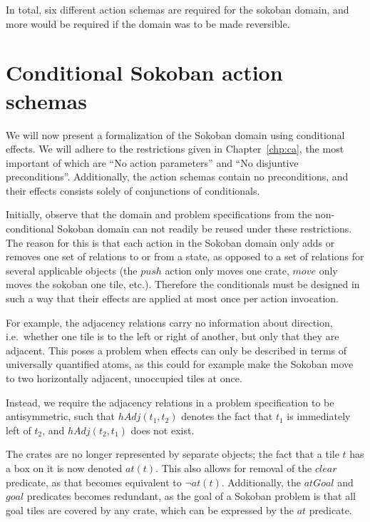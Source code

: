 \documentclass[../Master.tex]{subfiles}
\begin{document}
In total, six different action schemas are required for the sokoban domain, and more would be required if the domain was to be made reversible.

\section{Conditional Sokoban action schemas}\label{sec:sokocond}

We will now present a formalization of the Sokoban domain using conditional effects. We will adhere to the restrictions given in Chapter~\ref{chp:ca}, the most important of which are ``No action parameters'' and ``No disjuntive preconditions''. Additionally, the action schemas contain no preconditions, and their effects consists solely of conjunctions of conditionals.

Initially, observe that the domain and problem specifications from the non-conditional Sokoban domain can not readily be reused under these restrictions. The reason for this is that each action in the Sokoban domain only adds or removes one set of relations to or from a state, as opposed to a set of relations for several applicable objects (the $push$ action only moves one crate, $move$ only moves the sokoban one tile, etc.). Therefore the conditionals must be designed in such a way that their effects are applied at most once per action invocation.

For example, the adjacency relations carry no information about direction, i.e.\ whether one tile is to the left or right of another, but only that they are adjacent. This poses a problem when effects can only be described in terms of universally quantified atoms, as this could for example make the Sokoban move to two horizontally adjacent, unoccupied tiles at once.

Instead, we require the adjacency relations in a problem specification to be antisymmetric, such that $hAdj\left( t_1, t_2\right)$ denotes the fact that $t_1$ is immediately left of $t_2$, and $hAdj\left( t_2, t_1\right)$ does not exist.

The crates are no longer represented by separate objects; the fact that a tile $t$ has a box on it is now denoted $at(t)$. This also allows for removal of the $clear$ predicate, as that becomes equivalent to $\neg at(t)$. Additionally, the $atGoal$ and $goal$ predicates becomes redundant, as the goal of a Sokoban problem is that all goal tiles are covered by any crate, which can be expressed by the $at$ predicate.
\end{document}
